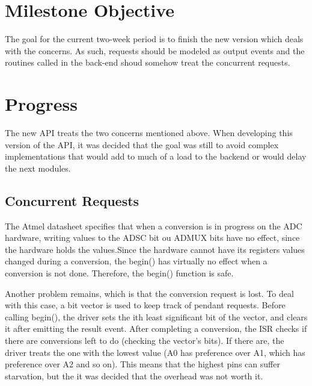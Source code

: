\documentclass{article}
\begin{document}
\section{Milestone Objective}

\tab The goal for the current two-week period is to finish the new version which deals with the concerns. As such, requests should be modeled as output events and the routines called in the back-end shoud somehow treat the concurrent requests.

\section{Progress}
\tab The new API treats the two concerns mentioned above. When developing this version of the API, it was decided that the goal was still to avoid complex implementations that would add to much of a load to the backend or would delay the next modules.

\subsection{Concurrent Requests}
\tab The Atmel datasheet specifies that when a conversion is in progress on the ADC hardware, writing values to the ADSC bit ou ADMUX bits have no effect, since the hardware holds the values.Since the hardware cannot have its registers values changed during a conversion, the begin() has virtually no effect when a conversion is not done. Therefore, the begin() function is safe.
\par Another problem remains, which is that the conversion request is lost. To deal with this case, a bit vector is used to keep track of pendant requests. Before calling begin(), the driver sets the ith least significant bit of the vector, and clears it after emitting the result event. After completing a conversion, the ISR checks if there are conversions left to do (checking the vector's bits). If there are, the driver treats the one with the lowest value (A0 has preference over A1, which has preference over A2 and so on). This means that the highest pins can suffer starvation, but the it was decided that the overhead was not worth it.
\end{document}
